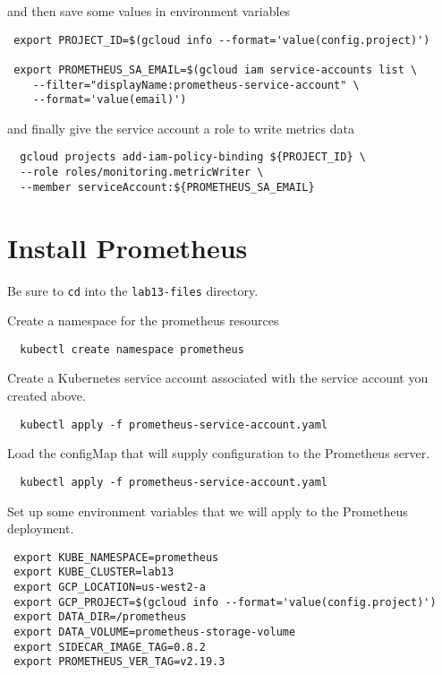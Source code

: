 \documentclass{article}
\begin{document}
and then save some values in environment variables

\begin{verbatim}
 export PROJECT_ID=$(gcloud info --format='value(config.project)')
 
 export PROMETHEUS_SA_EMAIL=$(gcloud iam service-accounts list \
    --filter="displayName:prometheus-service-account" \
    --format='value(email)')
\end{verbatim}

and finally give the service account a role to write metrics data

\begin{verbatim}
  gcloud projects add-iam-policy-binding ${PROJECT_ID} \
  --role roles/monitoring.metricWriter \
  --member serviceAccount:${PROMETHEUS_SA_EMAIL}
\end{verbatim}

\section{Install Prometheus}
Be sure to \texttt{cd} into the \texttt{lab13-files} directory.

Create a namespace for the prometheus resources

\begin{verbatim}
  kubectl create namespace prometheus
\end{verbatim}  

Create a Kubernetes service account associated with the service account you created above.

\begin{verbatim}
  kubectl apply -f prometheus-service-account.yaml
\end{verbatim}

  
Load the configMap that will supply configuration to the Prometheus server.

\begin{verbatim}
  kubectl apply -f prometheus-service-account.yaml
\end{verbatim}

Set up some environment variables that we will apply to the Prometheus deployment.

\begin{verbatim}
 export KUBE_NAMESPACE=prometheus
 export KUBE_CLUSTER=lab13
 export GCP_LOCATION=us-west2-a
 export GCP_PROJECT=$(gcloud info --format='value(config.project)')
 export DATA_DIR=/prometheus
 export DATA_VOLUME=prometheus-storage-volume
 export SIDECAR_IMAGE_TAG=0.8.2
 export PROMETHEUS_VER_TAG=v2.19.3
\end{verbatim} 
\end{document}

